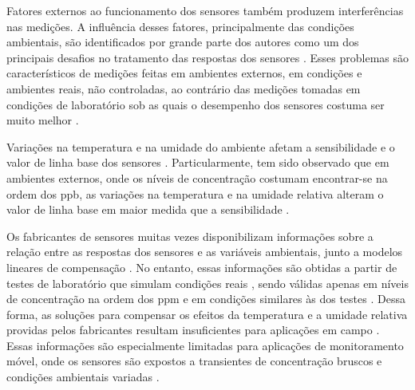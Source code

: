 Fatores externos ao funcionamento dos sensores também produzem interferências nas medições. A influência desses fatores, principalmente das condições ambientais, são identificados por grande parte dos autores como um dos principais desafios no tratamento das respostas dos sensores \cite*{Mead2013TheNetworks,Popoola2016DevelopmentStability,Rai2017End-userMonitoring,Baron2017AmperometricReview}. Esses problemas são característicos de medições feitas em ambientes externos, em condições e ambientes reais, não controladas, ao contrário das medições tomadas em condições de laboratório sob as quais o desempenho dos sensores costuma ser muito melhor \cite{Castell2017CanEstimates}.

Variações na temperatura e na umidade do ambiente afetam a sensibilidade e o valor de linha base dos sensores \cite{Popoola2016DevelopmentStability,Pang2018TheMonitoring}. Particularmente, tem sido observado que em ambientes externos, onde os níveis de concentração costumam encontrar-se na ordem dos \gls{ppb}, as variações na temperatura e na umidade relativa alteram o valor de linha base em maior medida que a sensibilidade \cite{Popoola2016DevelopmentStability}.

Os fabricantes de sensores muitas vezes disponibilizam informações sobre a relação entre as respostas dos sensores e as variáveis ambientais, junto a modelos lineares de compensação \cite{Alphasense2013AlphasenseHUMIDITY,SPECSensors2016ApplicationPerformance}. No entanto, essas informações são obtidas a partir de testes de laboratório que simulam condições reais \cite{Spinelle2013ProtocolPollution}, sendo válidas apenas em níveis de concentração na ordem dos \gls{ppm} e em condições similares às dos testes \cite{Lewis2018Low-costApplications}. Dessa forma, as soluções para compensar os efeitos da temperatura e a umidade relativa providas pelos fabricantes resultam insuficientes para aplicações em campo \cite{Pang2018TheMonitoring}. Essas informações são especialmente limitadas para aplicações de monitoramento móvel, onde os sensores são expostos a transientes de concentração bruscos e condições ambientais variadas \cite{Delaine2019InReview}.
	
